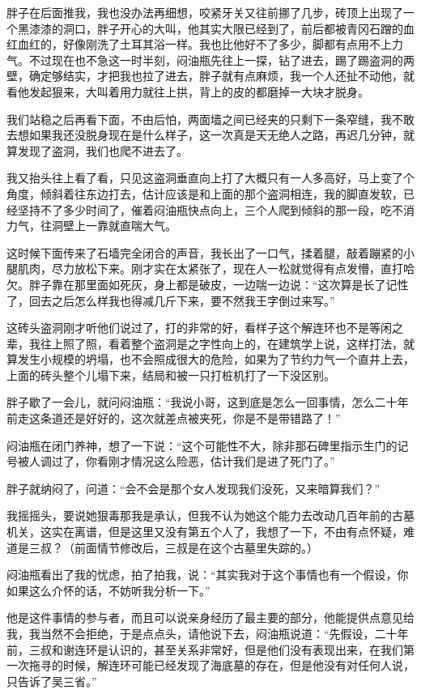 胖子在后面推我，我也没办法再细想，咬紧牙关又往前挪了几步，砖顶上出现了一个黑漆漆的洞口，胖子开心的大叫，他其实大限已经到了，前后都被青冈石蹭的血红血红的，好像刚洗了土耳其浴一样。我也比他好不了多少，脚都有点用不上力气。不过现在也不急这一时半刻，闷油瓶先往上一探，钻了进去，踢了踢盗洞的两壁，确定够结实，才把我也拉了进去，胖子就有点麻烦，我一个人还扯不动他，就看他发起狠来，大叫着用力就往上拱，背上的皮的都磨掉一大块才脱身。

我们站稳之后再看下面，不由后怕，两面墙之间已经夹的只剩下一条窄缝，我不敢去想如果我还没脱身现在是什么样子，这一次真是天无绝人之路，再迟几分钟，就算发现了盗洞，我们也爬不进去了。

我又抬头往上看了看，只见这盗洞垂直向上打了大概只有一人多高好，马上变了个角度，倾斜着往东边打去，估计应该是和上面的那个盗洞相连，我的脚直发软，已经坚持不了多少时间了，催着闷油瓶快点向上，三个人爬到倾斜的那一段，吃不消力气，往洞壁上一靠就直喘大气。

这时候下面传来了石墙完全闭合的声音，我长出了一口气，揉着腿，敲着蹦紧的小腿肌肉，尽力放松下来。刚才实在太紧张了，现在人一松就觉得有点发懵，直打哈欠。胖子靠在那里面如死灰，身上都是破皮，一边喘一边说：“这次算是长了记性了，回去之后怎么样我也得减几斤下来，要不然我王字倒过来写。”

这砖头盗洞刚才听他们说过了，打的非常的好，看样子这个解连环也不是等闲之辈，我往上照了照，看着整个盗洞是之字性向上的，在建筑学上说，这样打法，就算发生小规模的坍塌，也不会照成很大的危险，如果为了节约力气一个直井上去，上面的砖头整个儿塌下来，结局和被一只打桩机打了一下没区别。

胖子歇了一会儿，就问闷油瓶：“我说小哥，这到底是怎么一回事情，怎么二十年前走这条道还是好好的，这次就差点被夹死，你是不是带错路了！”

闷油瓶在闭门养神，想了一下说：“这个可能性不大，除非那石碑里指示生门的记号被人调过了，你看刚才情况这么险恶，估计我们是进了死门了。”

胖子就纳闷了，问道：“会不会是那个女人发现我们没死，又来暗算我们？”

我摇摇头，要说她狠毒那我是承认，但我不认为她这个能力去改动几百年前的古墓机关，这实在离谱，但是这里又没有第五个人了，我想了一下，不由有点怀疑，难道是三叔？（前面情节修改后，三叔是在这个古墓里失踪的。）

闷油瓶看出了我的忧虑，拍了拍我，说：“其实我对于这个事情也有一个假设，你如果这么介怀的话，不妨听我分析一下。”

他是这件事情的参与者，而且可以说亲身经历了最主要的部分，他能提供点意见给我，我当然不会拒绝，于是点点头，请他说下去，闷油瓶说道：“先假设，二十年前，三叔和谢连环是认识的，甚至关系非常好，但是他们没有表现出来，在我们第一次拖寻的时候，解连环可能已经发现了海底墓的存在，但是他没有对任何人说，只告诉了吴三省。”

